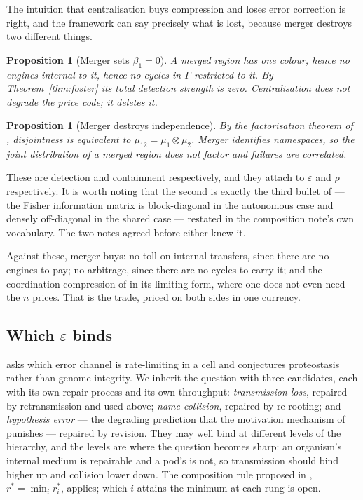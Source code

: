 \documentclass[11pt]{article}
\theoremstyle{plain}
\newtheorem{proposition}[theorem]{Proposition}
\theoremstyle{definition}
\theoremstyle{remark}
\newcommand{\bt}{\beta_1}
\begin{document}
The intuition that centralisation buys compression and loses error
correction is right, and the framework can say precisely what is lost,
because merger destroys two different things.

\begin{proposition}[Merger sets $\bt = 0$]
A merged region has one colour, hence no engines internal to it, hence no
cycles in $\Gamma$ restricted to it. By Theorem~\ref{thm:foster} its total
detection strength is zero. Centralisation does not degrade the price code;
it deletes it.
\end{proposition}

\begin{proposition}[Merger destroys independence]
By the factorisation theorem of \cite[\S4.2]{compose}, disjointness is
equivalent to $\mu_{12} = \mu_1 \otimes \mu_2$. Merger identifies
namespaces, so the joint distribution of a merged region does not factor
and failures are correlated.
\end{proposition}

These are detection and containment respectively, and they attach to
$\varepsilon$ and $\rho$ respectively. It is worth noting that the second
is exactly the third bullet of \cite[\S1]{compaut} --- the Fisher
information matrix is block-diagonal in the autonomous case and densely
off-diagonal in the shared case --- restated in the composition note's own
vocabulary. The two notes agreed before either knew it.

Against these, merger buys: no toll on internal transfers, since there are
no engines to pay; no arbitrage, since there are no cycles to carry it; and
the coordination compression of \cite[\S5]{vtok} in its limiting form,
where one does not even need the $n$ prices. That is the trade, priced on
both sides in one currency.

\subsection{Which $\varepsilon$ binds}
\label{sec:whicheps}

\cite{compaut} asks which error channel is rate-limiting in a cell and
conjectures proteostasis rather than genome integrity. We inherit the
question with three candidates, each with its own repair process and its
own throughput: \emph{transmission loss}, repaired by retransmission and
used above; \emph{name collision}, repaired by re-rooting; and
\emph{hypothesis error} --- the degrading prediction that the motivation
mechanism of \cite[\S2]{scientist} punishes --- repaired by revision. They
may well bind at different levels of the hierarchy, and the levels are
where the question becomes sharp: an organism's internal medium is
repairable and a pod's is not, so transmission should bind higher up and
collision lower down. The composition rule proposed in \cite{compaut},
$r^\ast = \min_i r^\ast_i$, applies; which $i$ attains the minimum at each
rung is open.
\end{document}
